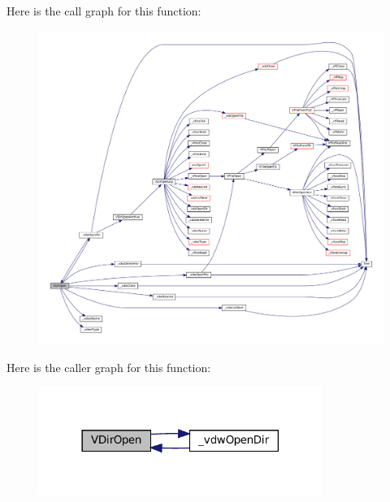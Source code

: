 Here is the call graph for this function\+:
\nopagebreak
\begin{figure}[H]
\begin{center}
\leavevmode
\includegraphics[width=350pt]{vfs-w32_8c_a2966065604f0fcfa278b5246d4d653b9_cgraph}
\end{center}
\end{figure}
Here is the caller graph for this function\+:
\nopagebreak
\begin{figure}[H]
\begin{center}
\leavevmode
\includegraphics[width=261pt]{vfs-w32_8c_a2966065604f0fcfa278b5246d4d653b9_icgraph}
\end{center}
\end{figure}
